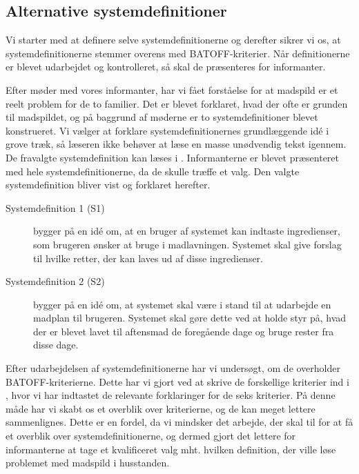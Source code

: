 \subsection{Alternative systemdefinitioner}
\label{subsec:alternativesystemdefinitioner}

Vi starter med at definere selve systemdefinitionerne og derefter sikrer vi os, at systemdefinitionerne stemmer overens med BATOFF-kriterier. Når definitionerne er blevet udarbejdet og kontrolleret, så skal de præsenteres for informanter. 

Efter møder med vores informanter, har vi fået forståelse for at madspild er et reelt problem for de to familier. Det er blevet forklaret, hvad der ofte er grunden til madspildet, og på baggrund af møderne er to systemdefinitioner blevet konstrueret. Vi vælger at forklare systemdefinitionernes grundlæggende idé i grove træk, så læseren ikke behøver at læse en masse unødvendig tekst igennem. De fravalgte systemdefinition kan læses i . Informanterne er blevet præsenteret med hele systemdefinitionerne, da de skulle træffe et valg. Den valgte systemdefinition bliver vist og forklaret herefter.

\begin{description}
\item[Systemdefinition 1 (S1)] bygger på en idé om, at en bruger af systemet kan indtaste ingredienser, som brugeren ønsker at bruge i madlavningen. Systemet skal give forslag til hvilke retter, der kan laves ud af disse ingredienser.
\item[Systemdefinition 2 (S2)] bygger på en idé om, at systemet skal være i stand til at udarbejde en madplan til brugeren. Systemet skal gøre dette ved at holde styr på, hvad der er blevet lavet til aftensmad de foregående dage og bruge rester fra disse dage.
\end{description}

Efter udarbejdelsen af systemdefinitionerne har vi undersøgt, om de overholder BATOFF-kriterierne. Dette har vi gjort ved at skrive de forskellige kriterier ind i , hvor vi har indtastet de relevante forklaringer for de seks kriterier. På denne måde har vi skabt os et overblik over kriterierne, og de kan meget lettere sammenlignes. Dette er en fordel, da vi mindsker det arbejde, der skal til for at få et overblik over systemdefinitionerne, og dermed gjort det lettere for informanterne at tage et kvalificeret valg mht. hvilken definition, der ville løse problemet med madspild i husstanden.

